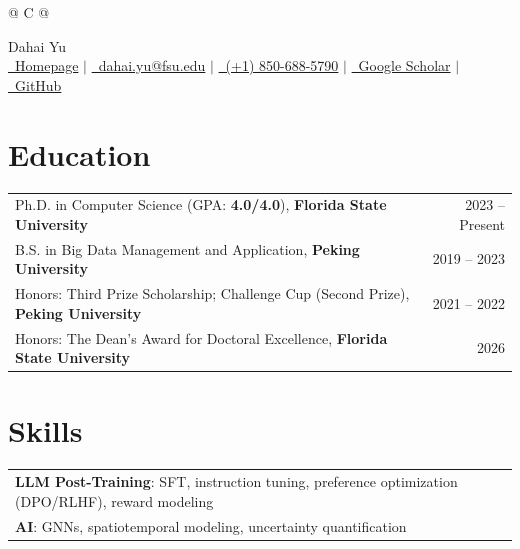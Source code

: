 \documentclass[a4paper,12pt]{article}
\begin{document}
\pagestyle{empty}
\vspace*{-1.3cm}

\begin{tabularx}{\linewidth}{@{} C @{}}

\Huge{Dahai Yu} \\[7.5pt]


\href{https://ufodestiny.github.io}{\raisebox{-0.05\height}\faGlobe\ Homepage} $|$
\href{mailto:dahai.yu@fsu.edu}{\raisebox{-0.05\height}\faEnvelope\ dahai.yu@fsu.edu} $|$
\href{tel:+18506885790}{\raisebox{-0.05\height}\faMobile\ (+1) 850-688-5790} $|$
\href{https://scholar.google.com/citations?user=8eH-vRUAAAAJ}{\raisebox{-0.05\height}\faGraduationCap\ Google Scholar} $|$
\href{https://github.com/UFOdestiny}{\raisebox{-0.05\height}\faGithub\ GitHub} \\
\end{tabularx}


\vspace*{-0.25cm}


\section{Education}
\begin{tabularx}{\linewidth}{@{}X r@{}}
Ph.D. in Computer Science (GPA: \textbf{4.0/4.0}), \textbf{\textcolor{FSUBrown}{Florida State University}} & 2023 -- Present \\

B.S. in Big Data Management and Application, \textbf{\textcolor{PKURed}{Peking University}} & 2019 -- 2023 \\

Honors: Third Prize Scholarship; Challenge Cup (Second Prize), \textbf{\textcolor{PKURed}{Peking University}} & 2021 -- 2022 \\

Honors: The Dean’s Award for Doctoral Excellence, \textbf{\textcolor{FSUBrown}{Florida State University}} & 2026 \\

\end{tabularx}
\vspace*{-0.25cm}

\section{Skills}
\begin{tabularx}{\linewidth}{@{}l X@{}}
\textbf{LLM Post-Training}: SFT, instruction tuning, preference optimization (DPO/RLHF), reward modeling\\
\textbf{AI}: GNNs, spatiotemporal modeling, uncertainty quantification \\

\end{tabularx}
\vspace*{-0.25cm}
\end{document}
